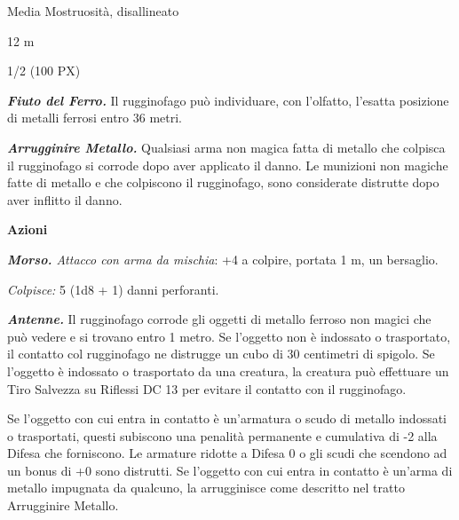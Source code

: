 \begin{multicols}{2}
{
\begin{description}[noitemsep, topsep=0pt, parsep=0pt, partopsep=0pt, itemsep=1pt, leftmargin=2.35cm,  labelwidth=2.2cm, itemindent=0cm, listparindent=0pt] %
\setlength{\baselineskip}{10pt}
\item[\textbf{Taglia/Tipo}] Media Mostruosità, disallineato
\item[\textbf{Caratt.}] 
\item[\textbf{Punti Ferita}] 
\item[\textbf{Movimento}] 12 m
\item[\textbf{Tiri Salvez.}] 
\item[\textbf{Sensi}] 
\item[\textbf{Sfida}] 1/2 (100 PX)
\end{description}
\smallskip

\emph{\textbf{Fiuto del Ferro.}} Il rugginofago può individuare, con l'olfatto, l'esatta posizione di metalli ferrosi entro 36 metri.

\emph{\textbf{Arrugginire Metallo.}} Qualsiasi arma non magica fatta di metallo che colpisca il rugginofago si corrode dopo aver applicato il danno. Le munizioni non magiche fatte di metallo e che colpiscono il rugginofago, sono considerate distrutte dopo aver inflitto il danno.

\textbf{Azioni}

\emph{\textbf{Morso.} Attacco con arma da mischia}: +4 a colpire, portata 1 m, un bersaglio.

\emph{Colpisce:} 5 (1d8 + 1) danni perforanti.

\emph{\textbf{Antenne.}} Il rugginofago corrode gli oggetti di metallo ferroso non magici che può vedere e si trovano entro 1 metro. Se l'oggetto non è indossato o trasportato, il contatto col rugginofago ne distrugge un cubo di 30 centimetri di spigolo. Se l'oggetto è indossato o trasportato da una creatura, la creatura può effettuare un Tiro Salvezza su Riflessi DC 13 per evitare il contatto con il rugginofago.

Se l'oggetto con cui entra in contatto è un'armatura o scudo di metallo indossati o trasportati, questi subiscono una penalità permanente e cumulativa di -2 alla Difesa che forniscono. Le armature ridotte a Difesa 0 o gli scudi che scendono ad un bonus di +0 sono distrutti. Se l'oggetto con cui entra in contatto è un'arma di metallo impugnata da qualcuno, la arrugginisce come descritto nel tratto Arrugginire Metallo.

}
\end{multicols}
